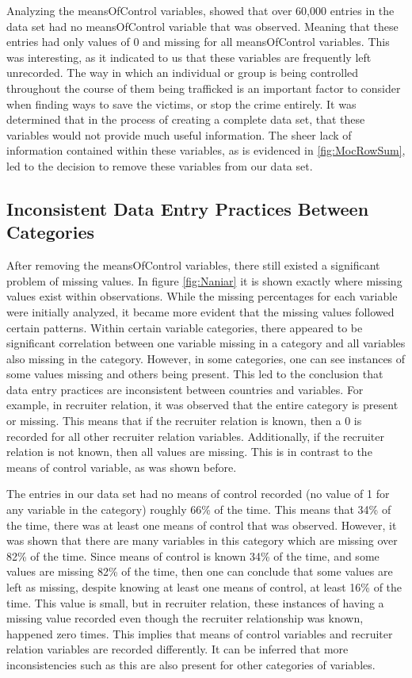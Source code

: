 \documentclass{article} %
\begin{document}
	Analyzing the meansOfControl variables, showed that over 60,000 entries in the data set had no meansOfControl variable that was observed. Meaning that these entries had only values of 0 and missing for all meansOfControl variables. This was interesting, as it indicated to us that these variables are frequently left unrecorded. The way in which an individual or group is being controlled throughout the course of them being trafficked is an important factor to consider when finding ways to save the victims, or stop the crime entirely. It was determined that in the process of creating a complete data set, that these variables would not provide much useful information. The sheer lack of information contained within these variables, as is evidenced in \ref{fig:MocRowSum}, led to the decision to remove these variables from our data set.
	

	\subsection{Inconsistent Data Entry Practices Between Categories}
	
	After removing the meansOfControl variables, there still existed a significant problem of missing values. In figure \ref{fig:Naniar} it is shown exactly where missing values exist within observations. While the missing percentages for each variable were initially analyzed, it became more evident that the missing values followed certain patterns. Within certain variable categories, there appeared to be significant correlation between one variable missing in a category and all variables also missing in the category. However, in some categories, one can see instances of some values missing and others being present. This led to the conclusion that data entry practices are inconsistent between countries and variables. For example, in recruiter relation, it was observed that the entire category is present or missing. This means that if the recruiter relation is known, then a 0 is recorded for all other recruiter relation variables. Additionally, if the recruiter relation is not known, then all values are missing. This is in contrast to the means of control variable, as was shown before.
	
	The entries in our data set had no means of control recorded (no value of 1 for any variable in the category) roughly 66\% of the time. This means that 34\% of the time, there was at least one means of control that was observed. However, it was shown that there are many variables in this category which are missing over 82\% of the time. Since means of control is known 34\% of the time, and some values are missing 82\% of the time, then one can conclude that some values are left as missing, despite knowing at least one means of control, at least 16\% of the time. This value is small, but in recruiter relation, these instances of having a missing value recorded even though the recruiter relationship was known, happened zero times. This implies that means of control variables and recruiter relation variables are recorded differently. It can be inferred that more inconsistencies such as this are also present for other categories of variables.
	
\end{document}
